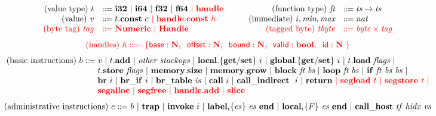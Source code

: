 \documentclass{standalone}
\begin{document}
\footnotesize

\[
  \begin{array}{rl}
    \text{(value type)} ~ t &\dotdoteq \xxWithirtytwo~|~\xxWisixtyfour~|~\xxWfthirtytwo~|~\xxWfsixtyfour~\rr{|~\xxWhandle}\\
    \text{(value)} ~\V{v} &\dotdoteq t.\xxWconst~c~\rr{|~\xxWhandle.\xxWconst~h}\\
    \rr{\text{(byte tag)}~\V{tag}} & \rr{\dotdoteq \xxWNumeric ~|~\xxWHandle}
  \end{array}\qquad
  \begin{array}{rl}
    \text{(function type)} ~ \textit{ft} &\dotdoteq \textit{ts} \to \textit{ts}\\
    \text{(immediate)} ~ i,\textit{min},\textit{max} &\dotdoteq \textit{nat}\\
    \rr{\text{(tagged byte)}~\V{tbyte}} & \rr{\dotdoteq \V{byte}\times\V{tag}} 
  \end{array}
  \]
  \[ \rr{\text{(handles)}~h\dotdoteq~\{ \xxWbase:\xxCN,\;\; \xxWoffset:\xxCN,\;\; \xxWbound:\xxCN,\;\; \xxWvalid:\xxCbool,\;\; \xxWid:\xxCN~\}} \]
\[
  \begin{array}{@{}l@{}}
    \text{(basic instructions)}~b \dotdoteq
    \begin{array}[t]{@{}l@{}}
      \V{v}~|~t.\KK{add}~|~\textit{other stackops}~|~
      \KK{local.\{get/set\}}~i~|~\KK{global.\{get/set\}}~i~|~
      t.\KK{load}~\V{flags}~|~
      \\
      t.\KK{store}~\V{flags}~|~\KK{memory.size}~|~ \KK{memory.grow}~|~
      \KK{block}~\textit{ft}~\textit{bs} ~|~ \KK{loop}~\textit{ft}~\V{bs}~|~\KK{if}~\V{ft}~\V{bs}~\V{bs}~|~
      \\
      \KK{br}~i~|~\KK{br\_if}~i~|~\KK{br\_table}~\V{is}~|~ \xxWcall~i~|~\xxWcallindirect~i~|~\KK{return}~\rr{|~\xxWsegload~\V{t}~|~\xxWsegstore~\V{t}~|}
      \\
      \rr{\xxWsegalloc~|~\xxWsegfree~|~\xxWhandleadd~|~\xxWslice}
    \end{array}
  \end{array}
  \]
  \[
  \begin{array}{@{}l@{}}
    \text{(administrative instructions)}~e \dotdoteq
    \begin{array}[t]{@{}l@{}}
      \V{b}~|~\KK{trap}~|~\xxWinvoke~i~|~\xxWlabel{i}{\V{es}}{\V{es}}~|~
      \xxWlocal{i}{F}{\V{es}}~|~\xxWcallhost~\V{tf}~\V{hidx}~\V{vs}
    \end{array}
  \end{array}
\]
\end{document}
